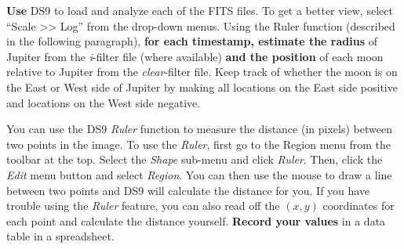 \begin{steps}
	\item \textbf{Use} DS9 to load and analyze each of the FITS files. To get a better view, select ``Scale >> Log'' from the drop-down menus. Using the Ruler function (described in the following paragraph), \textbf{for each timestamp, estimate the radius} of Jupiter from the \textit{i}-filter file (where available) \textbf{and the position} of each moon relative to Jupiter from the \textit{clear}-filter file. Keep track of whether the moon is on the East or West side of Jupiter by making all locations on the East side positive and locations on the West side negative.
\end{steps}

You can use the DS9 \textit{Ruler} function to measure the distance (in pixels) between two points in the image. To use the \textit{Ruler}, first go to the Region menu from the toolbar at the top. Select the \textit{Shape} sub-menu and click \textit{Ruler}. Then, click the \textit{Edit} menu button and select \textit{Region}. You can then use the mouse to draw a line between two points and DS9 will calculate the distance for you. If you have trouble using the \textit{Ruler} feature, you can also read off the $(x,y)$ coordinates for each point and calculate the distance yourself. \textbf{Record your values} in a data table in a spreadsheet.

